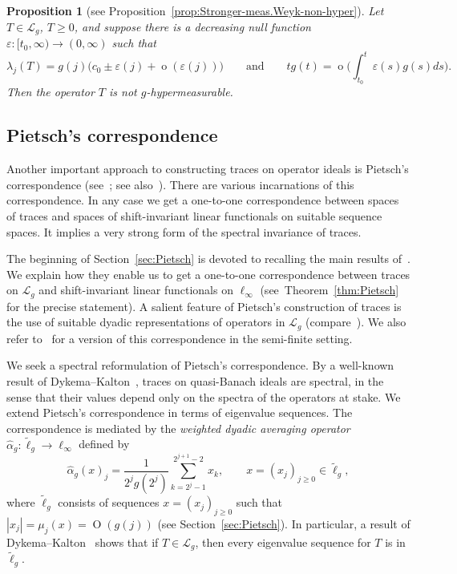 \documentclass[10pt, a4paper]{amsart}
\newcommand{\sL}{\mathscr{L}}
\newcommand{\op}{\operatorname}
\numberwithin{equation}{section}
\newtheorem{propositionalph}[theoremalph]{Proposition}
\theoremstyle{definition}
\theoremstyle{remark}
\begin{document}
\begin{propositionalph}[see Proposition~\ref{prop:Stronger-meas.Weyk-non-hyper}] \label{prop:Intro.Stronger-meas.Weyk-non-hyper}
 Let $T\in \sL_g$, $T\geq 0$, and suppose there is a decreasing null function $\varepsilon:[t_0,\infty)\rightarrow (0,\infty)$ such that
  \begin{equation*}
 \lambda_j(T)=g(j)\big(c_0 \pm \varepsilon(j) +\op{o}\left( \varepsilon(j)\right)\big) \qquad \text{and} \qquad tg(t) =\op{o}\bigg(\int_{t_0}^t \varepsilon(s)g(s)ds\bigg).
\end{equation*}
Then the operator $T$ is not $g$-hypermeasurable.
\end{propositionalph}

\subsection{Pietsch's correspondence}
Another important approach to constructing traces on operator ideals is Pietsch's correspondence (see~\cite{Pi:IEOT17, Pi:AM20}; see also~\cite{LSZ:Book}). There are various incarnations of this correspondence. In any case we get a one-to-one correspondence between spaces of traces and spaces of shift-invariant linear functionals on suitable sequence spaces. It implies a very strong form of the spectral invariance of traces.

The beginning of Section~\ref{sec:Pietsch} is devoted to recalling the main results of~\cite{Pi:IEOT17, Pi:AM20}. We explain how they enable us to get a one-to-one correspondence between traces on $\sL_g$ and shift-invariant linear functionals on $\ell_\infty$ (see~Theorem~\ref{thm:Pietsch} for the precise statement). A salient feature of Pietsch's construction of traces is the use of suitable dyadic representations of operators in $\sL_g$ (compare~\cite{LSZ:Book}). We also refer to~\cite{LU:JMAA25} for a version of this correspondence in the semi-finite setting.

We seek a spectral reformulation of Pietsch's correspondence. By a well-known result of Dykema--Kalton~\cite{DK:Crelle98}, traces on quasi-Banach ideals are spectral, in the sense that their values depend only on the spectra of the operators at stake. We extend Pietsch's correspondence in terms of eigenvalue sequences. The correspondence is mediated by the \emph{weighted dyadic averaging operator} $\hat{\alpha}_g:\tilde{\ell}_g\rightarrow \ell_\infty$ defined by
\begin{equation*}
  \hat{\alpha}_g(x)_j= \frac{1}{2^jg(2^j)} \sum_{k=2^j-1}^{2^{j+1}-2} x_k, \qquad x=(x_j)_{j\geq 0}\in \tilde{\ell}_g, 
\end{equation*}
where $\tilde{\ell}_g$ consists of sequences $x=(x_j)_{j\geq 0}$ such that $|x_j|=\mu_j(x)=\op{O}(g(j))$ (see Section~\ref{sec:Pietsch}). In particular, a result of Dykema--Kalton~\cite{DK:Crelle98} shows that if $T\in \sL_g$, then every eigenvalue sequence for $T$ is in $\tilde{\ell}_g$. 
\end{document}
